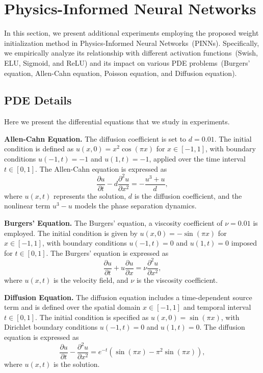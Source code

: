 \documentclass{article} \usepackage{iclr2025_conference,times}
\begin{document}
\newpage
\section{Physics-Informed Neural Networks}
In this section, we present additional experiments employing the proposed weight initialization method in Physics-Informed Neural Networks~(PINNs). Specifically, we empirically analyze its relationship with different activation functions~(Swish, ELU, Sigmoid, and ReLU) and its impact on various PDE problems~(Burgers' equation, Allen-Cahn equation, Poisson equation, and Diffusion equation).


\subsection{PDE Details}\label{pdes}
Here we present the differential equations that we study in experiments.

\medskip
\textbf{Allen-Cahn Equation.} The diffusion coefficient is set to $d = 0.01$. The initial condition is defined as $u(x, 0) = x^2 \cos(\pi x)$ for $x \in [-1, 1]$, with boundary conditions $u(-1, t) = -1$ and $u(1, t) = -1$, applied over the time interval $t \in [0, 1]$. The Allen-Cahn equation is expressed as
\begin{equation*}\label{eqn-AC}
\frac{\partial u}{\partial t} - d \frac{\partial^2 u}{\partial x^2} =  -\frac{u^3 + u}{d}, 
\end{equation*}
where $u(x, t)$ represents the solution, $d$ is the diffusion coefficient, and the nonlinear term $u^3 - u$ models the phase separation dynamics. 
\medskip

\textbf{Burgers' Equation.} The Burgers' equation, a viscosity coefficient of $\nu = 0.01$ is employed. The initial condition is given by $u(x, 0) = -\sin(\pi x)$ for $x \in [-1, 1]$, with boundary conditions $u(-1, t) = 0$ and $u(1, t) = 0$ imposed for $t \in [0, 1]$. The Burgers' equation is expressed as
\begin{equation*}\label{eqn-Burgers}
    \frac{\partial u}{\partial t} + u \frac{\partial u}{\partial x} = \nu \frac{\partial^2 u}{\partial x^2},
\end{equation*}
where $u(x, t)$ is the velocity field, and $\nu$ is the viscosity coefficient.
\medskip

\textbf{Diffusion Equation.} The diffusion equation includes a time-dependent source term and is defined over the spatial domain \(x \in [-1, 1]\) and temporal interval \(t \in [0, 1]\). The initial condition is specified as \(u(x, 0) = \sin(\pi x)\), with Dirichlet boundary conditions \(u(-1, t) = 0\) and \(u(1, t) = 0\). The diffusion equation is expressed as
\begin{equation*}\label{eqn-Diffusion}
\frac{\partial u}{\partial t} - \frac{\partial^2 u}{\partial x^2} = e^{-t} \left(\sin(\pi x) - \pi^2 \sin(\pi x)\right),
\end{equation*}
where \(u(x, t)\) is the solution. 
\medskip
\end{document}
